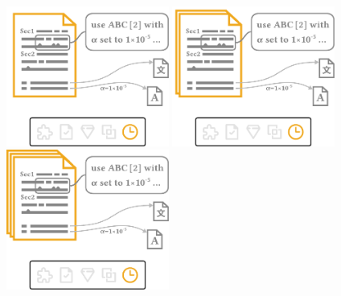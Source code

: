 \documentclass[en,16:9,smallfoot]{sdqbeamer}
\begin{document}
\begin{frame}
\begin{overprint}
            \centering\includegraphics[width=0.4\textwidth]{imgs/schema_asp_4_0}
            \centering\includegraphics[width=0.4\textwidth]{imgs/schema_asp_4_1}
            \centering\includegraphics[width=0.4\textwidth]{imgs/schema_asp_4_2}
       \end{overprint}
   \end{frame}
\end{document}
